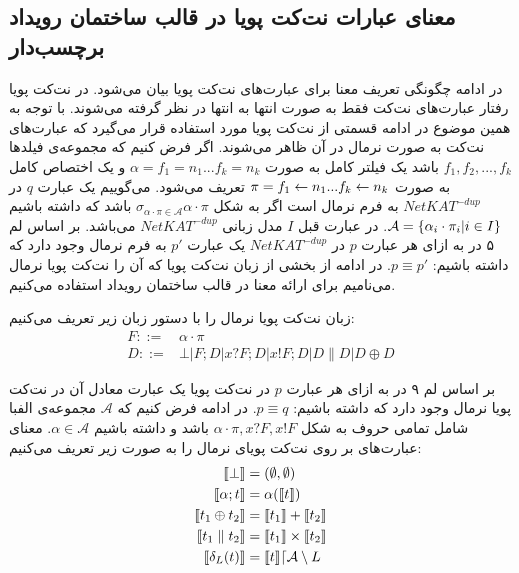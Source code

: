 \subsection{معنای عبارات نت‌کت پویا در قالب ساختمان رویداد برچسب‌دار}

در ادامه چگونگی تعریف معنا
برای عبارت‌های نت‌کت پویا بیان می‌شود.
در نت‌کت پویا رفتار عبارت‌های نت‌کت فقط به صورت انتها به انتها در نظر گرفته می‌شوند.
با توجه به همین موضوع در ادامه قسمتی از نت‌کت پویا مورد استفاده قرار می‌گیرد که عبارت‌های نت‌کت به صورت نرمال در آن ظاهر می‌شوند.
اگر فرض کنیم که مجموعه‌ی فیلد‌ها
$f_1,f_2,...,f_k$
باشد یک فیلتر کامل
به صورت
$\alpha = f_1 = n_1 ... f_k = n_k$
و یک اختصاص کامل
به صورت
$\pi = f_1 \leftarrow n_1 ... f_k \leftarrow n_k$
تعریف می‌شود.
می‌گوییم یک عبارت
$q$
در
$NetKAT^{-dup}$
به فرم نرمال است
اگر به شکل
$\sigma_{\alpha\cdot\pi \in \mathcal{A}}\alpha\cdot\pi$
باشد که داشته باشیم
$\mathcal{A} = \{\alpha_i\cdot\pi_i | i \in I\}$.
در عبارت قبل
$I$
مدل زبانی
$NetKAT^{-dup}$
می‌باشد.
بر اساس لم ۵ در
\cite{dynetkat}
به ازای هر عبارت
$p$
در
$NetKAT^{-dup}$
یک عبارت
$p'$
به فرم نرمال وجود دارد که داشته باشیم:
$p\equiv p'$.
در ادامه از بخشی از زبان نت‌کت پویا که آن را نت‌کت پویا‌ نرمال می‌نامیم برای ارائه معنا در قالب ساختمان رویداد استفاده می‌کنیم.
\begin{definition}
    زبان نت‌کت پویا‌ نرمال را با دستور زبان زیر تعریف می‌کنیم:
    \begin{align*}
        F ::= & \alpha\cdot\pi                                          \\
        D ::= & \bot | F;D | x?F;D | x!F;D | D \parallel D | D \oplus D
    \end{align*}
\end{definition}
بر اساس لم ۹ در 
\cite{dynetkat}
به ازای هر عبارت 
$p$
در نت‌کت پویا یک عبارت معادل آن در نت‌کت پویا نرمال وجود دارد که داشته باشیم:
$p \equiv q$.
در ادامه فرض کنیم که
$\mathcal{A}$
مجموعه‌ی الفبا شامل تمامی حروف به شکل
$\alpha\cdot\pi,x?F,x!F$
باشد و داشته باشیم
$\alpha \in \mathcal{A}$.
معنای عبارت‌های بر روی نت‌کت پویای نرمال را به صورت زیر تعریف می‌کنیم:
\begin{align*}
    \llbracket \bot \rrbracket              & = (\emptyset,\emptyset)                               \\
    \llbracket \alpha;t \rrbracket          & = \alpha(\llbracket t \rrbracket)                       \\
    \llbracket t_1 \oplus t_2 \rrbracket    & = \llbracket t_1 \rrbracket + \llbracket t_2 \rrbracket                 \\
    \llbracket t_1 \parallel t_2 \rrbracket & = \llbracket t_1 \rrbracket \times \llbracket t_2 \rrbracket            \\
    \llbracket \delta_{L}(t) \rrbracket     & = \llbracket t \rrbracket\lceil \mathcal{A} \setminus L
\end{align*}